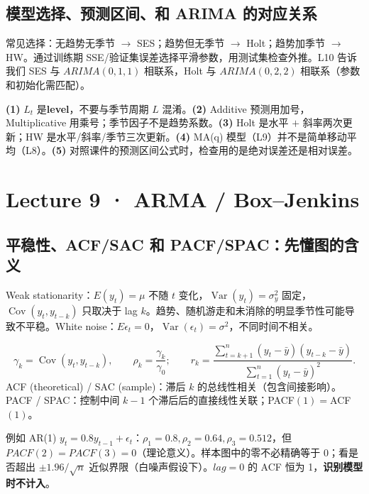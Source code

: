 \documentclass[UTF8,fontset=fandol,10.5pt,a4paper]{ctexart}
\newcommand{\eng}[1]{{\sffamily\color{navy}#1}}
\begin{document}
\subsection{模型选择、预测区间、和 ARIMA 的对应关系}
常见选择：无趋势无季节 $\to$ SES；趋势但无季节 $\to$ Holt；趋势加季节 $\to$ HW。通过训练期 SSE/验证集误差选择平滑参数，用测试集检查外推。L10 告诉我们 SES 与 $ARIMA(0,1,1)$ 相联系，Holt 与 $ARIMA(0,2,2)$ 相联系（参数和初始化需匹配）。
\begin{pitbox}
\textbf{(1)} $L_t$ 是\textbf{level}，不要与季节周期 $L$ 混淆。\textbf{(2)} Additive 预测用加号，Multiplicative 用乘号；季节因子不是趋势系数。\textbf{(3)} Holt 是水平 $+$ 斜率两次更新；HW 是水平/斜率/季节三次更新。\textbf{(4)} MA(q) 模型（L9）并不是简单移动平均（L8）。\textbf{(5)} 对照课件的预测区间公式时，检查用的是绝对误差还是相对误差。
\end{pitbox}
\clearpage
\section{Lecture 9 · ARMA / Box--Jenkins}
\subsection{平稳性、ACF/SAC 和 PACF/SPAC：先懂图的含义}
\eng{Weak stationarity}：$E(y_t)=\mu$ 不随 $t$ 变化，$\operatorname{Var}(y_t)=\sigma_y^2$ 固定，$\operatorname{Cov}(y_t,y_{t-k})$ 只取决于 lag $k$。趋势、随机游走和未消除的明显季节性可能导致不平稳。\eng{White noise}：$E\epsilon_t=0$，$\operatorname{Var}(\epsilon_t)=\sigma^2$，不同时间不相关。
\begin{keybox}
\[\gamma_k=\operatorname{Cov}(y_t,y_{t-k}),\qquad \rho_k=\frac{\gamma_k}{\gamma_0};\qquad r_k=\frac{\sum_{t=k+1}^n(y_t-\bar y)(y_{t-k}-\bar y)}{\sum_{t=1}^n(y_t-\bar y)^2}.\]
\eng{ACF (theoretical) / SAC (sample)}：滞后 $k$ 的总线性相关（包含间接影响）。\eng{PACF / SPAC}：控制中间 $k-1$ 个滞后后的直接线性关联；PACF$(1)=$ACF$(1)$。
\end{keybox}
例如 AR(1) $y_t=0.8y_{t-1}+\epsilon_t$：$\rho_1=0.8,\rho_2=0.64,\rho_3=0.512$，但 $PACF(2)=PACF(3)=0$（理论意义）。样本图中的零不必精确等于 0；看是否超出 $\pm1.96/\sqrt n$ 近似界限（白噪声假设下）。$lag=0$ 的 ACF 恒为 1，\textbf{识别模型时不计入}。
\end{document}
